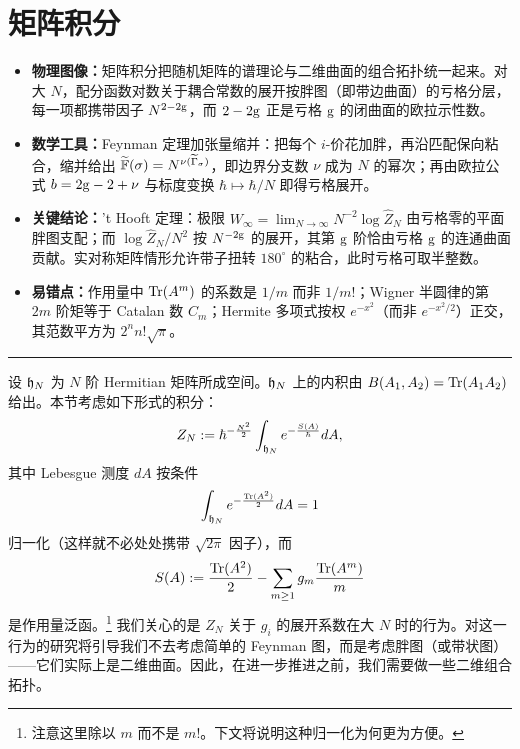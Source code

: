 \section{矩阵积分}

\begin{keytakeaways}
\begin{itemize}
  \item \textbf{物理图像：}矩阵积分把随机矩阵的谱理论与二维曲面的组合拓扑统一起来。对大 $N$，配分函数对数关于耦合常数的展开按胖图（即带边曲面）的亏格分层，每一项都携带因子 $N^{2-2{\rm g}}$，而 $2-2{\rm g}$ 正是亏格 ${\rm g}$ 的闭曲面的欧拉示性数。
  \item \textbf{数学工具：}Feynman 定理加张量缩并：把每个 $i$-价花加胖，再沿匹配保向粘合，缩并给出 $\widetilde{\Bbb F}(\sigma)=N^{\nu(\widetilde\Gamma_\sigma)}$，即边界分支数 $\nu$ 成为 $N$ 的幂次；再由欧拉公式 $b=2{\rm g}-2+\nu$ 与标度变换 $\hbar\mapsto\hbar/N$ 即得亏格展开。
  \item \textbf{关键结论：}'t Hooft 定理：极限 $W_\infty=\lim_{N\to\infty}N^{-2}\log\widehat Z_N$ 由亏格零的平面胖图支配；而 $\log\widehat Z_N/N^2$ 按 $N^{-2{\rm g}}$ 的展开，其第 ${\rm g}$ 阶恰由亏格 ${\rm g}$ 的连通曲面贡献。实对称矩阵情形允许带子扭转 $180^\circ$ 的粘合，此时亏格可取半整数。
  \item \textbf{易错点：}作用量中 $\Tr(A^m)$ 的系数是 $1/m$ 而非 $1/m!$；Wigner 半圆律的第 $2m$ 阶矩等于 Catalan 数 $C_m$；Hermite 多项式按权 $e^{-x^2}$（而非 $e^{-x^2/2}$）正交，其范数平方为 $2^nn!\sqrt{\pi}$。
\end{itemize}
\end{keytakeaways}

\bigskip
\noindent\rule{\textwidth}{0.6pt}
\bigskip

设 ${\frak h}_N$ 为 $N$ 阶 Hermitian 矩阵所成空间。${\frak h}_N$ 上的内积由 $B(A_1,A_2)=\Tr(A_1A_2)$ 给出。本节考虑如下形式的积分：
$$
Z_N:=\hbar^{-\frac{N^2}{2}}\int_{{\frak h}_N}e^{-\frac{S(A)}{\hbar}}dA,
$$
其中 Lebesgue 测度 $dA$ 按条件
$$
\int_{{\frak h}_N} e^{-\frac{{\rm Tr}(A^2)}{2}}dA=1
$$ 
归一化（这样就不必处处携带 $\sqrt{2\pi}$ 因子），而
$$
S(A):=\frac{\Tr(A^2)}{2}-\sum_{m\ge 1} g_m\frac{\Tr(A^m)}{m}
$$
是作用量泛函。\footnote{注意这里除以 $m$ 而不是 $m!$。下文将说明这种归一化为何更为方便。} 我们关心的是 $Z_N$ 关于 $g_i$ 的展开系数在大 $N$ 时的行为。对这一行为的研究将引导我们不去考虑简单的 Feynman 图，而是考虑胖图（或带状图）——它们实际上是二维曲面。因此，在进一步推进之前，我们需要做一些二维组合拓扑。

